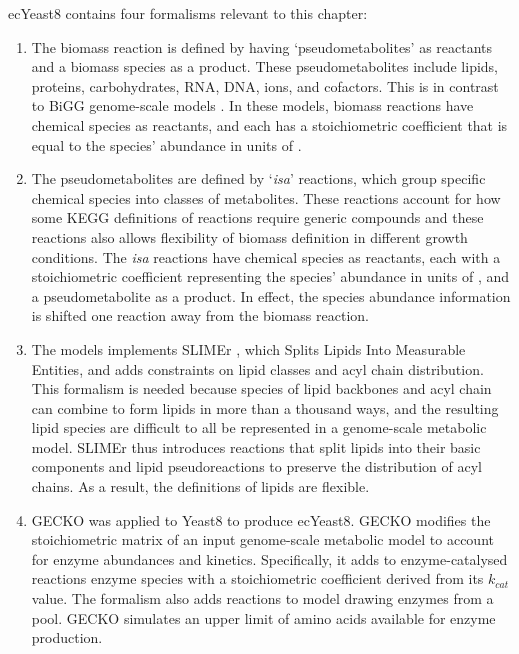 ecYeast8 contains four formalisms relevant to this chapter:
\begin{enumerate}
  \item
        The biomass reaction is defined by having `pseudometabolites' as reactants and a biomass species as a product.
        These pseudometabolites include lipids, proteins, carbohydrates, RNA, DNA, ions, and cofactors.
        This is in contrast to BiGG genome-scale models \parencite{norsigianBiGGModels20202020}.
        In these models, biomass reactions have chemical species as reactants, and each has a stoichiometric coefficient that is equal to the species' abundance in units of \SI{}{\mmolgdw}.
  \item
        The pseudometabolites are defined by `\textit{isa}' reactions, which group specific chemical species into classes of metabolites.
        These reactions account for how some KEGG definitions of reactions require generic compounds and these reactions also allows flexibility of biomass definition in different growth conditions.
        The \textit{isa} reactions have chemical species as reactants, each with a stoichiometric coefficient representing the species' abundance in units of \SI{}{\mmolgdw}, and a pseudometabolite as a product.
        In effect, the species abundance information is shifted one reaction away from the biomass reaction.
  \item
        The models implements SLIMEr \parencite{sanchezSLIMErProbingFlexibility2019}, which Splits Lipids Into Measurable Entities, and adds constraints on lipid classes and acyl chain distribution.
        This formalism is needed because species of lipid backbones and acyl chain can combine to form lipids in more than a thousand ways, and the resulting lipid species are difficult to all be represented in a genome-scale metabolic model.
        SLIMEr thus introduces reactions that split lipids into their basic components and lipid pseudoreactions to preserve the distribution of acyl chains.
        As a result, the definitions of lipids are flexible.
  \item
        GECKO was applied to Yeast8 to produce ecYeast8.  GECKO modifies the stoichiometric matrix of an input genome-scale metabolic model to account for enzyme abundances and kinetics.
        Specifically, it adds to enzyme-catalysed reactions enzyme species with a stoichiometric coefficient derived from its $k_{cat}$ value.
        The formalism also adds reactions to model drawing enzymes from a pool.
        GECKO simulates an upper limit of amino acids available for enzyme production.
\end{enumerate}

